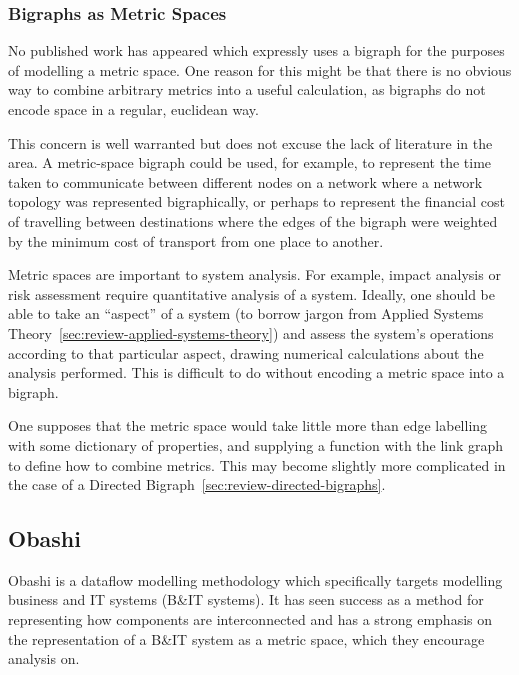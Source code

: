 \subsubsection{Bigraphs as Metric Spaces}

No published work has appeared which expressly uses a bigraph for the purposes
of modelling a metric space. One reason for this might be that there is no
obvious way to combine arbitrary metrics into a useful calculation, as bigraphs
do not encode space in a regular, euclidean way.
\par

This concern is well warranted but does not excuse the lack of literature in the
area. A metric-space bigraph could be used, for example, to represent the time
taken to communicate between different nodes on a network where a network
topology was represented bigraphically, or perhaps to represent the financial
cost of travelling between destinations where the edges of the bigraph were
weighted by the minimum cost of transport from one place to another.
\par

Metric spaces are important to system analysis. For example, impact analysis or
risk assessment require quantitative analysis of a system. Ideally, one should
be able to take an ``aspect'' of a system (to borrow jargon from Applied Systems
Theory~\ref{sec:review-applied-systems-theory}) and assess the system's
operations according to that particular aspect, drawing numerical calculations
about the analysis performed. This is difficult to do without encoding a metric
space into a bigraph.
\par

One supposes that the metric space would take little more than edge labelling
with some dictionary of properties, and supplying a function with the link graph
to define how to combine metrics. This may become slightly more complicated in
the case of a Directed Bigraph~\ref{sec:review-directed-bigraphs}.
\par

\subsection{Obashi}

Obashi is a dataflow modelling methodology which specifically targets modelling
business and IT systems (B\&IT systems). It has seen success as a method for
representing how components are interconnected and has a strong emphasis on the
representation of a B\&IT system as a metric space, which they encourage analysis
on.
\par

